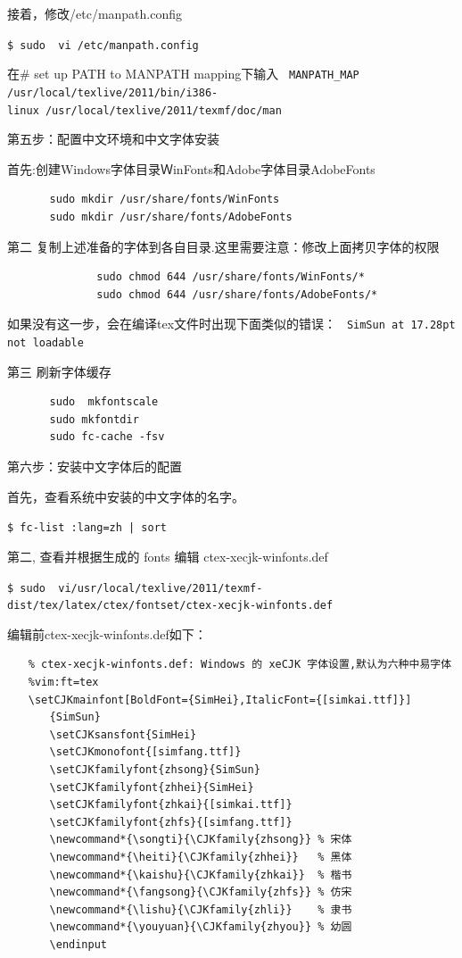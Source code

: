 接着，修改/etc/manpath.config    

\verb"$ sudo  vi /etc/manpath.config"

在\# set up PATH to MANPATH mapping下输入
\verb" MANPATH_MAP /usr/local/texlive/2011/bin/i386-linux /usr/local/texlive/2011/texmf/doc/man"

第五步：配置中文环境和中文字体安装

首先:创建Windows字体目录ＷinFonts和Adobe字体目录AdobeFonts
\begin{verbatim}
　　　　sudo mkdir /usr/share/fonts/WinFonts
　　　　sudo mkdir /usr/share/fonts/AdobeFonts
\end{verbatim}

第二 复制上述准备的字体到各自目录.这里需要注意：修改上面拷贝字体的权限 
\begin{verbatim}
              sudo chmod 644 /usr/share/fonts/WinFonts/*
              sudo chmod 644 /usr/share/fonts/AdobeFonts/*
\end{verbatim}

如果没有这一步，会在编译tex文件时出现下面类似的错误：
\verb" SimSun at 17.28pt not loadable"

第三 刷新字体缓存
\begin{verbatim}
　　　　sudo  mkfontscale
　　　　sudo mkfontdir
　　　　sudo fc-cache -fsv
\end{verbatim}

第六步：安装中文字体后的配置

首先，查看系统中安装的中文字体的名字。

\verb"$ fc-list :lang=zh | sort"

第二, 查看并根据生成的 fonts 编辑 ctex-xecjk-winfonts.def

\verb"$ sudo  vi/usr/local/texlive/2011/texmf-dist/tex/latex/ctex/fontset/ctex-xecjk-winfonts.def"

编辑前ctex-xecjk-winfonts.def如下：
\begin{verbatim}
　　% ctex-xecjk-winfonts.def: Windows 的 xeCJK 字体设置,默认为六种中易字体
　　%vim:ft=tex
　　\setCJKmainfont[BoldFont={SimHei},ItalicFont={[simkai.ttf]}]  
　　　　{SimSun}
　　　　\setCJKsansfont{SimHei}
　　　　\setCJKmonofont{[simfang.ttf]}
　　　　\setCJKfamilyfont{zhsong}{SimSun}
　　　　\setCJKfamilyfont{zhhei}{SimHei}
　　　　\setCJKfamilyfont{zhkai}{[simkai.ttf]}
　　　　\setCJKfamilyfont{zhfs}{[simfang.ttf]}
　　　　\newcommand*{\songti}{\CJKfamily{zhsong}} % 宋体
　　　　\newcommand*{\heiti}{\CJKfamily{zhhei}}   % 黑体
　　　　\newcommand*{\kaishu}{\CJKfamily{zhkai}}  % 楷书
　　　　\newcommand*{\fangsong}{\CJKfamily{zhfs}} % 仿宋
　　　　\newcommand*{\lishu}{\CJKfamily{zhli}}    % 隶书
　　　　\newcommand*{\youyuan}{\CJKfamily{zhyou}} % 幼圆
　　　　\endinput
\end{verbatim}


